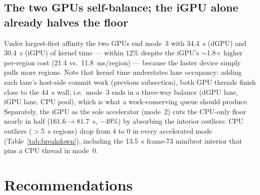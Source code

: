 \documentclass[
	english,
	letterpaper, oneside
]{article}
\begin{document}
\subsection{The two GPUs self-balance; the iGPU alone already halves the floor}

Under largest-first affinity the two GPUs end mode~3 with 34.4~s (dGPU)
and 30.4~s (iGPU) of kernel time --- within $12\%$ despite the iGPU's
$\sim$1.8$\times$ higher per-region cost (21.4 vs.\ 11.8~ms/region) --- because the
faster device simply pulls more regions. Note that kernel time understates lane
occupancy: adding each lane's host-side commit work (previous subsection), both GPU
threads finish close to the 44~s wall, i.e.\ mode~3 ends in a three-way
balance (dGPU lane, iGPU lane, CPU pool), which is what a work-conserving queue
should produce. Separately, the iGPU as the sole accelerator
(mode~2) cuts the CPU-only floor nearly in half ($161.6\to81.7$~s, $-49\%$) by
absorbing the interior outliers: CPU outliers ($>$5~s regions) drop from 4 to 0 in
every accelerated mode (Table~\ref{tab:breakdown}), including the
13.5~s frame-73 minibrot interior that pins a CPU thread in mode~0.

\section{Recommendations}
\end{document}
